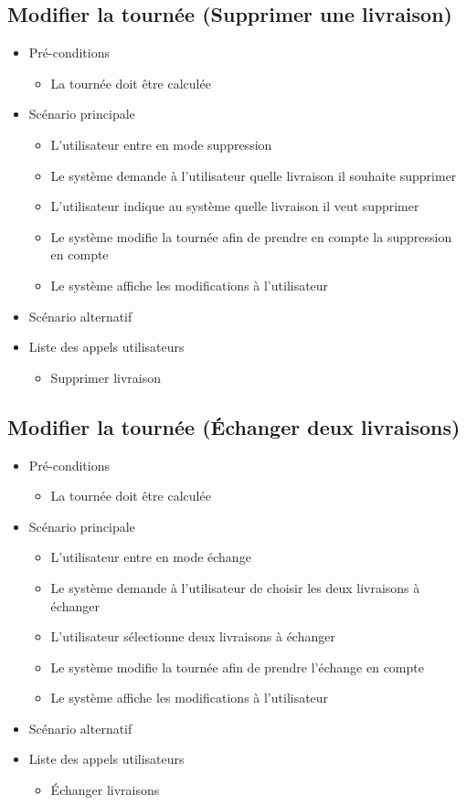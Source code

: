 \documentclass[10pt,a4paper]{book}
\begin{document}
\subsection{Modifier la tournée (Supprimer une livraison)}
\begin{itemize}
	\item{Pré-conditions}
	\begin{itemize}
		\item{La tournée doit être calculée}
	\end{itemize}
	\item{Scénario principale}
	\begin{itemize}
		\item{L'utilisateur entre en mode suppression}
		\item{Le système demande à l'utilisateur quelle livraison il souhaite supprimer}
		\item{L'utilisateur indique au système quelle livraison il veut supprimer}
		\item{Le système modifie la tournée afin de prendre en compte la suppression en compte}
		\item{Le système affiche les modifications à l'utilisateur}
	\end{itemize}
	\item{Scénario alternatif}
	\item{Liste des appels utilisateurs}
	\begin{itemize}
		\item{Supprimer livraison}
	\end{itemize}
\end{itemize}
\subsection{Modifier la tournée (Échanger deux livraisons)}
\begin{itemize}
	\item{Pré-conditions}
		\begin{itemize}
		\item{La tournée doit être calculée}
	\end{itemize}
	\item{Scénario principale}
	\begin{itemize}
		\item{L’utilisateur entre en mode échange}
		\item{Le système demande à l’utilisateur de choisir les deux livraisons à échanger}
		\item{L’utilisateur sélectionne deux livraisons à échanger}
		\item{Le système modifie la tournée afin de prendre l’échange en compte}
		\item{Le système affiche les modifications à l’utilisateur}
	\end{itemize}
	\item{Scénario alternatif}
	\item{Liste des appels utilisateurs}
	\begin{itemize}
		\item{Échanger livraisons}
	\end{itemize}
\end{itemize}
\end{document}
